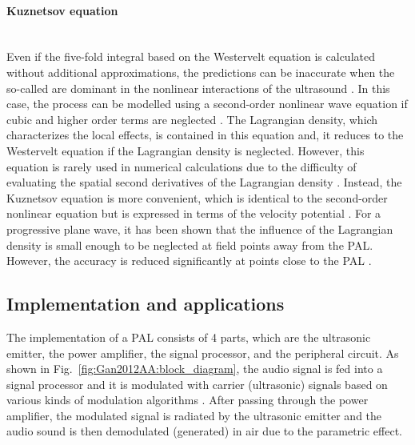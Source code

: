 \paragraph{Kuznetsov equation}\mbox{}\\
Even {if} the five-fold integral based on the Westervelt equation is calculated without additional approximations, the {predictions} can be inaccurate when the so-called  are dominant in the nonlinear interactions of {the} ultrasound \cite{Aanonsen1984DistortionHarmonicGeneration}.
In this case, the process can be modelled using a second-order nonlinear wave equation if cubic and higher order terms are neglected \cite{Aanonsen1984DistortionHarmonicGeneration}.
The Lagrangian density, which characterizes the local effects, is contained in this equation {and}, it reduces to {the} Westervelt equation if the Lagrangian density is neglected. 
However, this equation is rarely used in numerical calculations due to the difficulty of {evaluating the} spatial second derivatives of the Lagrangian density \cite{Kagawa1992FiniteElementSimulation}.
Instead, the Kuznetsov {equation} is more convenient, which is identical to the second-order nonlinear equation but is expressed in terms of the velocity potential \cite{Aanonsen1984DistortionHarmonicGeneration, Cervenka2019VersatileComputationalApproach}.
For a progressive plane wave, it has been shown {that} the influence of the Lagrangian density is small enough to be neglected at field points away from the PAL. 
However, the accuracy is reduced significantly at points close to the PAL \cite{Cervenka2019VersatileComputationalApproach}.


\subsection{Implementation and applications}
\label{sec:review_implement}

{The} implementation of a PAL consists of 4 parts, which are 
the ultrasonic emitter, the power amplifier, the signal processor, and the peripheral circuit.
As shown in Fig.~\ref{fig:Gan2012AA:block_diagram}, 
the audio signal is fed into a signal processor and it is modulated with carrier (ultrasonic) signals based on various kinds of modulation algorithms \cite{Yoneyama1983AudioSpotlightApplication, Matsui2013DesignAudioSpot, Shi2016EffectUltrasonicEmitter}.
After passing through the power amplifier, the modulated signal is radiated by the ultrasonic emitter and the audio sound is then demodulated (generated) in air due to the parametric effect.

